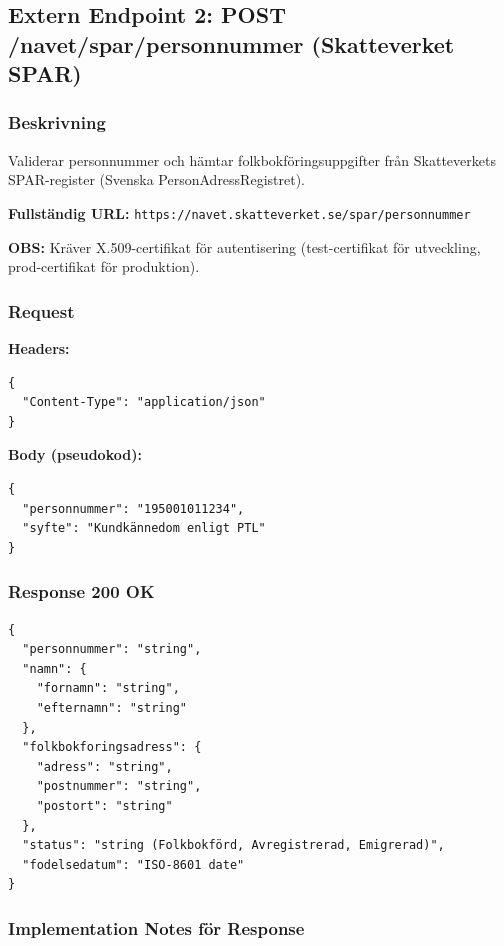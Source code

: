 \documentclass[12pt,a4paper]{article}
\begin{document}
\subsection{Extern Endpoint 2: POST /navet/spar/personnummer (Skatteverket SPAR)}

\subsubsection{Beskrivning}

Validerar personnummer och hämtar folkbokföringsuppgifter från Skatteverkets SPAR-register (Svenska PersonAdressRegistret).

\textbf{Fullständig URL:} \texttt{https://navet.skatteverket.se/spar/personnummer}

\textbf{OBS:} Kräver X.509-certifikat för autentisering (test-certifikat för utveckling, prod-certifikat för produktion).

\subsubsection{Request}

\textbf{Headers:}
\begin{lstlisting}
{
  "Content-Type": "application/json"
}
\end{lstlisting}

\textbf{Body (pseudokod):}
\begin{lstlisting}
{
  "personnummer": "195001011234",
  "syfte": "Kundkännedom enligt PTL"
}
\end{lstlisting}

\subsubsection{Response 200 OK}
\begin{lstlisting}
{
  "personnummer": "string",
  "namn": {
    "fornamn": "string",
    "efternamn": "string"
  },
  "folkbokforingsadress": {
    "adress": "string",
    "postnummer": "string",
    "postort": "string"
  },
  "status": "string (Folkbokförd, Avregistrerad, Emigrerad)",
  "fodelsedatum": "ISO-8601 date"
}
\end{lstlisting}

\subsubsection{Implementation Notes för Response}
\end{document}
